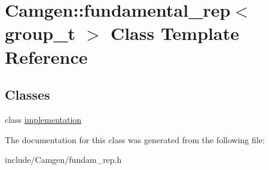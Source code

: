 \hypertarget{a00236}{}\section{Camgen\+:\+:fundamental\+\_\+rep$<$ group\+\_\+t $>$ Class Template Reference}
\label{a00236}
\subsection*{Classes}
\begin{DoxyCompactItemize}
\item 
class \hyperlink{a00292}{implementation}
\end{DoxyCompactItemize}


The documentation for this class was generated from the following file\+:\begin{DoxyCompactItemize}
\item 
include/\+Camgen/fundam\+\_\+rep.\+h\end{DoxyCompactItemize}
